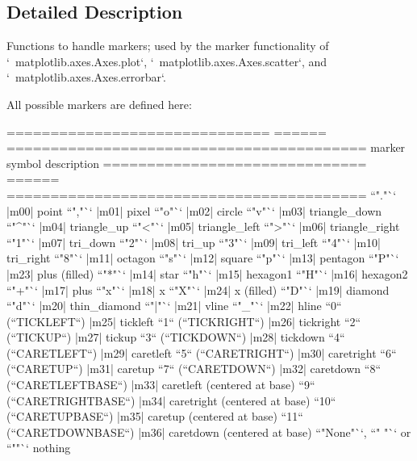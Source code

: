 \subsection{Detailed Description}
\begin{DoxyVerb}Functions to handle markers; used by the marker functionality of
`~matplotlib.axes.Axes.plot`, `~matplotlib.axes.Axes.scatter`, and
`~matplotlib.axes.Axes.errorbar`.

All possible markers are defined here:

============================== ====== =========================================
marker                         symbol description
============================== ====== =========================================
``"."``                        |m00|  point
``","``                        |m01|  pixel
``"o"``                        |m02|  circle
``"v"``                        |m03|  triangle_down
``"^"``                        |m04|  triangle_up
``"<"``                        |m05|  triangle_left
``">"``                        |m06|  triangle_right
``"1"``                        |m07|  tri_down
``"2"``                        |m08|  tri_up
``"3"``                        |m09|  tri_left
``"4"``                        |m10|  tri_right
``"8"``                        |m11|  octagon
``"s"``                        |m12|  square
``"p"``                        |m13|  pentagon
``"P"``                        |m23|  plus (filled)
``"*"``                        |m14|  star
``"h"``                        |m15|  hexagon1
``"H"``                        |m16|  hexagon2
``"+"``                        |m17|  plus
``"x"``                        |m18|  x
``"X"``                        |m24|  x (filled)
``"D"``                        |m19|  diamond
``"d"``                        |m20|  thin_diamond
``"|"``                        |m21|  vline
``"_"``                        |m22|  hline
``0`` (``TICKLEFT``)           |m25|  tickleft
``1`` (``TICKRIGHT``)          |m26|  tickright
``2`` (``TICKUP``)             |m27|  tickup
``3`` (``TICKDOWN``)           |m28|  tickdown
``4`` (``CARETLEFT``)          |m29|  caretleft
``5`` (``CARETRIGHT``)         |m30|  caretright
``6`` (``CARETUP``)            |m31|  caretup
``7`` (``CARETDOWN``)          |m32|  caretdown
``8`` (``CARETLEFTBASE``)      |m33|  caretleft (centered at base)
``9`` (``CARETRIGHTBASE``)     |m34|  caretright (centered at base)
``10`` (``CARETUPBASE``)       |m35|  caretup (centered at base)
``11`` (``CARETDOWNBASE``)     |m36|  caretdown (centered at base)
``"None"``, ``" "`` or  ``""``        nothing

\end{DoxyVerb}
